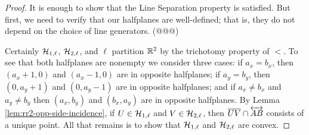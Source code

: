 \begin{proof}
It is enough to show that the Line Separation property is satisfied.
But first, we need to verify that our halfplanes are well-defined; that is, they do not depend on the choice of line generators.
(@@@)

Certainly \(\mathcal{H}_{1,\ell}\), \(\mathcal{H}_{2,\ell}\), and \(\ell\) partition \(\mathbb{R}^2\) by the trichotomy property of \(<\).
To see that both halfplanes are nonempty we consider three cases: if \(a_x = b_x\), then \((a_x+1,0)\) and \((a_x-1,0)\) are in opposite halfplanes; if \(a_y = b_y\), then \((0,a_y+1)\) and \((0,a_y-1)\) are in opposite halfplanes; and if \(a_x \neq b_x\) and \(a_y \neq b_y\) then \((a_x,b_y)\) and \((b_x,a_y)\) are in opposite halfplanes.
By Lemma \ref{lem:rr2-opp-side-incidence}, if \(U \in \mathcal{H}_{1,\ell}\) and \(V \in \mathcal{H}_{2,\ell}\), then \(\overline{UV} \cap \overleftrightarrow{AB}\) consists of a unique point.
All that remains is to show that \(\mathcal{H}_{1,\ell}\) and \(\mathcal{H}_{2,\ell}\) are convex.


\end{proof}
